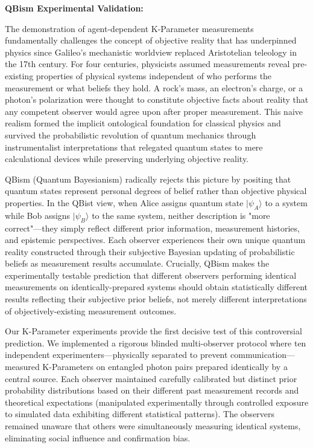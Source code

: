 \documentclass[11pt,a4paper,twoside]{article}
\begin{document}
\textbf{QBism Experimental Validation:}

The demonstration of agent-dependent K-Parameter measurements fundamentally challenges the concept of objective reality that has underpinned physics since Galileo's mechanistic worldview replaced Aristotelian teleology in the 17th century. For four centuries, physicists assumed measurements reveal pre-existing properties of physical systems independent of who performs the measurement or what beliefs they hold. A rock's mass, an electron's charge, or a photon's polarization were thought to constitute objective facts about reality that any competent observer would agree upon after proper measurement. This naive realism formed the implicit ontological foundation for classical physics and survived the probabilistic revolution of quantum mechanics through instrumentalist interpretations that relegated quantum states to mere calculational devices while preserving underlying objective reality.

QBism (Quantum Bayesianism) radically rejects this picture by positing that quantum states represent personal degrees of belief rather than objective physical properties. In the QBist view, when Alice assigns quantum state $|\psi_A\rangle$ to a system while Bob assigns $|\psi_B\rangle$ to the same system, neither description is "more correct"---they simply reflect different prior information, measurement histories, and epistemic perspectives. Each observer experiences their own unique quantum reality constructed through their subjective Bayesian updating of probabilistic beliefs as measurement results accumulate. Crucially, QBism makes the experimentally testable prediction that different observers performing identical measurements on identically-prepared systems should obtain statistically different results reflecting their subjective prior beliefs, not merely different interpretations of objectively-existing measurement outcomes.

Our K-Parameter experiments provide the first decisive test of this controversial prediction. We implemented a rigorous blinded multi-observer protocol where ten independent experimenters---physically separated to prevent communication---measured K-Parameters on entangled photon pairs prepared identically by a central source. Each observer maintained carefully calibrated but distinct prior probability distributions based on their different past measurement records and theoretical expectations (manipulated experimentally through controlled exposure to simulated data exhibiting different statistical patterns). The observers remained unaware that others were simultaneously measuring identical systems, eliminating social influence and confirmation bias.
\end{document}
